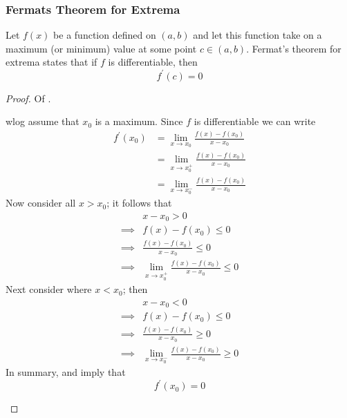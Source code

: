 \subsubsection{Fermats Theorem for Extrema}\label{subsubsec-fermtas-theorem-extrema}

\begin{thm}\label{thm-fermats-theorem-extrema}
	Let $f(x)$ be a function defined on $(a,b)$ and let this function take on
	a maximum (or minimum) value at some point $c\in(a,b)$. Fermat's theorem for
	extrema states that if $f$ is differentiable, then
	\begin{equation}
		f^\prime(c)=0
	\end{equation}
\end{thm}

\begin{proof}
	Of .
	\begin{flushleft}
		\gls{wlog} assume that $x_0$ is a maximum. Since $f$ is differentiable
		we can write
		\begin{align*}
			f^\prime(x_0) & = \lim_{x \to x_0}\frac{f(x)-f(x_0)}{x-x_0}   \\
			              & = \lim_{x \to x_0^+}\frac{f(x)-f(x_0)}{x-x_0} \\
			              & = \lim_{x \to x_0^-}\frac{f(x)-f(x_0)}{x-x_0}
		\end{align*}
		Now consider all $x>x_0$; it follows that
		\begin{align}
			 & x-x_0>0\nonumber                                                                     \\
			\implies
			 & f(x)-f(x_0)\leq0\nonumber                                                            \\
			\implies
			 & \frac{f(x)-f(x_0)}{x-x_0}\leq0\nonumber                                              \\
			\implies
			 & \lim_{x \to x_0^+}\frac{f(x)-f(x_0)}{x-x_0}\leq0\label{eq-fermats-theorem-extrema:1}
		\end{align}
		Next consider where $x<x_0$; then
		\begin{align}
			 & x-x_0<0\nonumber                                                                     \\
			\implies
			 & f(x)-f(x_0)\leq0\nonumber                                                            \\
			\implies
			 & \frac{f(x)-f(x_0)}{x-x_0}\geq0\nonumber                                              \\
			\implies
			 & \lim_{x \to x_0^-}\frac{f(x)-f(x_0)}{x-x_0}\geq0\label{eq-fermats-theorem-extrema:2}
		\end{align}
		In summary,  and 
		imply that
		\begin{equation*}
			f^\prime(x_0)=0
		\end{equation*}
	\end{flushleft}
\end{proof}

